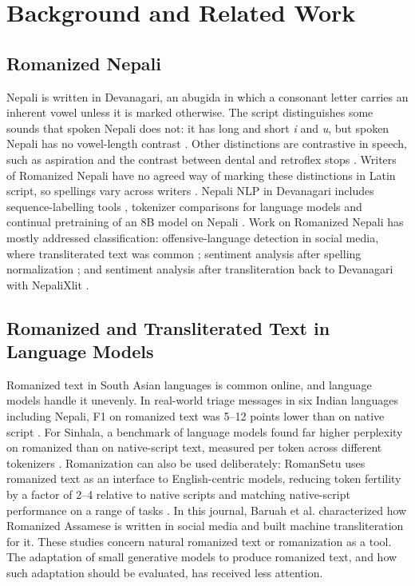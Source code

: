 \documentclass{article}
\begin{document}
\section{Background and Related Work}\label{sec:related}

\subsection{Romanized Nepali}

Nepali is written in Devanagari, an abugida in which a consonant letter carries an inherent vowel unless it is marked otherwise. The script distinguishes some sounds that spoken Nepali does not: it has long and short \emph{i} and \emph{u}, but spoken Nepali has no vowel-length contrast \citep{khatiwada2009}. Other distinctions are contrastive in speech, such as aspiration and the contrast between dental and retroflex stops \citep{khatiwada2009}. Writers of Romanized Nepali have no agreed way of marking these distinctions in Latin script, so spellings vary across writers \citep{chaudhary2025}. Nepali NLP in Devanagari includes sequence-labelling tools \citep{rai2023}, tokenizer comparisons for language models \citep{luitel2025} and continual pretraining of an 8B model on Nepali \citep{duwal2025}. Work on Romanized Nepali has mostly addressed classification: offensive-language detection in social media, where transliterated text was common \citep{niraula2021}; sentiment analysis after spelling normalization \citep{chaudhary2025}; and sentiment analysis after transliteration back to Devanagari with NepaliXlit \citep{patel2026}.

\subsection{Romanized and Transliterated Text in Language Models}

Romanized text in South Asian languages is common online, and language models handle it unevenly. In real-world triage messages in six Indian languages including Nepali, F1 on romanized text was 5–12 points lower than on native script \citep{khullar2025}. For Sinhala, a benchmark of language models found far higher perplexity on romanized than on native-script text, measured per token across different tokenizers \citep{rajapakse2026}. Romanization can also be used deliberately: RomanSetu uses romanized text as an interface to English-centric models, reducing token fertility by a factor of 2–4 relative to native scripts and matching native-script performance on a range of tasks \citep{husain2024}. In this journal, Baruah et al. \citep{baruah2024} characterized how Romanized Assamese is written in social media and built machine transliteration for it. These studies concern natural romanized text or romanization as a tool. The adaptation of small generative models to produce romanized text, and how such adaptation should be evaluated, has received less attention.
\end{document}
